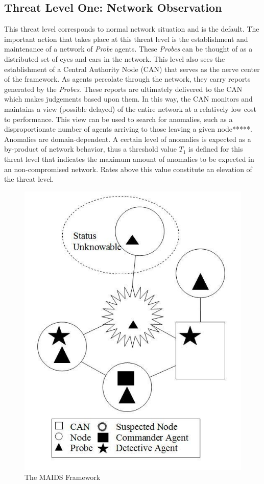 \documentclass{acm_proc_article-sp}
\begin{document}
\subsection{Threat Level One: Network Observation}
This threat level corresponds to normal network situation and is the default.  The important action that takes place at this threat level is the establishment and maintenance of a network of {\it Probe} agents.  These {\it Probes} can be thought of as a distributed set of eyes and ears in the network.  This level also sees the establishment of a Central Authority Node (CAN) that serves as the nerve center of the framework.  As agents percolate through the network, they carry reports generated by the {\it Probes}.  These reports are ultimately delivered to the CAN which makes judgements based upon them.  In this way, the CAN monitors and maintains a view (possible delayed) of the entire network at a relatively low cost to performance.  This view can be used to search for anomalies, such as a disproportionate number of agents arriving to those leaving a given node*****.  Anomalies are domain-dependent.  A certain level of anomalies is expected as a by-product of network behavior, thus a threshold value $T_1$ is defined for this threat level that indicates the maximum amount of anomalies to be expected in an non-compromised network.  Rates above this value constitute an elevation of the threat level.

\begin{figure}
\centering
\includegraphics[scale=0.45]{maids}
\caption{The MAIDS Framework}
\label{fig:framework}
\end{figure}
\end{document}
